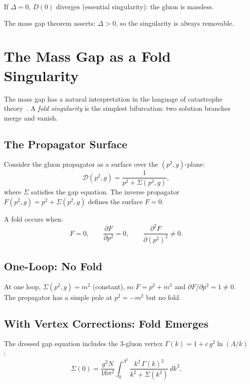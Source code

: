 \documentclass[11pt]{article}
\theoremstyle{definition}
\theoremstyle{remark}
\begin{document}
If $\Delta = 0$, $D(0)$ diverges (essential singularity):
the gluon is massless.

The mass gap theorem asserts: $\Delta > 0$, so the singularity is
always removable.

\section{The Mass Gap as a Fold Singularity}

The mass gap has a natural interpretation in the language of
catastrophe theory~\cite{arnold}. A \emph{fold singularity} is
the simplest bifurcation: two solution branches merge and vanish.

\subsection{The Propagator Surface}

Consider the gluon propagator as a surface over the
$(p^2, g)$-plane:
\begin{equation}\label{eq:surface}
  \mathcal{D}(p^2, g) = \frac{1}{p^2 + \Sigma(p^2, g)},
\end{equation}
where $\Sigma$ satisfies the gap equation. The inverse propagator
$F(p^2, g) = p^2 + \Sigma(p^2, g)$ defines the surface $F = 0$.

A fold occurs when:
\begin{equation}\label{eq:fold}
  F = 0, \qquad \frac{\partial F}{\partial p^2} = 0,
  \qquad \frac{\partial^2 F}{\partial (p^2)^2} \neq 0.
\end{equation}

\subsection{One-Loop: No Fold}

At one loop, $\Sigma(p^2, g) = m^2$ (constant), so
$F = p^2 + m^2$ and $\partial F/\partial p^2 = 1 \neq 0$.
The propagator has a simple pole at $p^2 = -m^2$ but no fold.

\subsection{With Vertex Corrections: Fold Emerges}

The dressed gap equation includes the 3-gluon vertex
$\Gamma(k) = 1 + c\,g^2 \ln(\Lambda/k)$:
\begin{equation}\label{eq:dressed}
  \Sigma(0) = \frac{g^2 N}{16\pi^2}\int_0^{\Lambda^2}
  \frac{k^2\,\Gamma(k)^2}{k^2 + \Sigma(k^2)}\,dk^2.
\end{equation}
\end{document}
